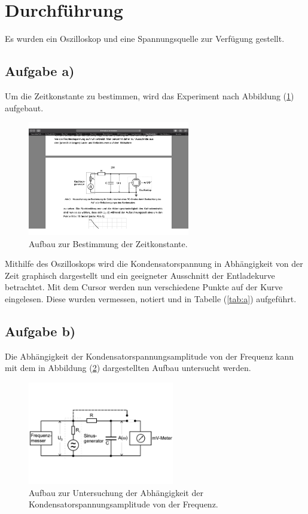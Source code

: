 \section{Durchführung}
Es wurden ein Oszilloskop und eine Spannungsquelle zur Verfügung gestellt.

\subsection{Aufgabe a)}
Um die Zeitkonstante zu bestimmen, wird das Experiment nach Abbildung (\ref{fig:rcaa}) aufgebaut.

\begin{figure}
            \centering
               \includegraphics[height=5cm]{rcaa.pdf}
               \caption{Aufbau zur Bestimmung der Zeitkonstante.}
               \label{fig:rcaa}
\end{figure}

\noindent
Mithilfe des Oszilloskops wird die Kondensatorspannung in Abhängigkeit von der Zeit graphisch dargestellt und ein geeigneter Ausschnitt der Entladekurve betrachtet.
Mit dem Cursor werden nun verschiedene Punkte auf der Kurve eingelesen.
Diese wurden vermessen, notiert und in Tabelle (\ref{tab:a}) aufgeführt.

\subsection{Aufgabe b)}
Die Abhängigkeit der Kondensatorspannungsamplitude von der Frequenz kann mit dem in Abbildung (\ref{fig:rcab}) dargestellten Aufbau untersucht werden.

\begin{figure}
            \centering
               \includegraphics[height=4.5cm]{rcab.pdf}
               \caption{Aufbau zur Untersuchung der Abhängigkeit der Kondensatorspannungsamplitude von der Frequenz.}
               \label{fig:rcab}
\end{figure}

